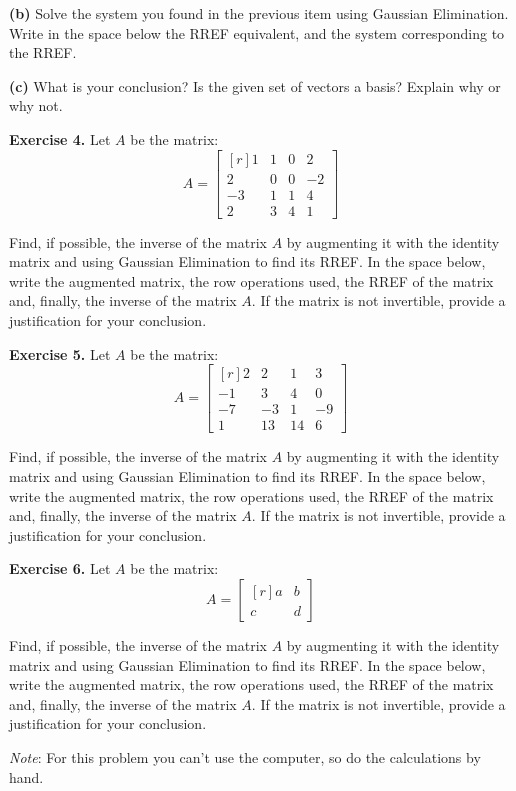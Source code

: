 \documentclass[12pt]{article}
\begin{document}
\vskip2in

\textbf{(b)} Solve the system you found in the previous item using Gaussian Elimination. Write in the space below the RREF equivalent, and the system corresponding to the RREF.

\vskip2.8in

\textbf{(c)} What is your conclusion? Is the given set of vectors a basis? Explain why or why not.

\clearpage

\textbf{Exercise 4.} Let $A$ be the matrix:
\[
A=\left[\begin{matrix*}[r]1 & 1 & 0 & 2\\2 & 0 & 0 & -2\\-3 & 1 & 1 & 4\\2 & 3 & 4 & 1\end{matrix*}\right]
\]

Find, if possible, the inverse of the matrix $A$ by augmenting it with the identity matrix and using Gaussian Elimination to find its RREF. In the space below, write the augmented matrix, the row operations used, the RREF of the matrix and, finally, the inverse of the matrix $A$. If the matrix is not invertible, provide a justification for your conclusion.

\clearpage

\textbf{Exercise 5.} Let $A$ be the matrix:
\[
A=\left[\begin{matrix*}[r]2 & 2 & 1 & 3\\-1 & 3 & 4 & 0\\-7 & -3 & 1 & -9\\1 & 13 & 14 & 6\end{matrix*}\right]
\]

Find, if possible, the inverse of the matrix $A$ by augmenting it with the identity matrix and using Gaussian Elimination to find its RREF. In the space below, write the augmented matrix, the row operations used, the RREF of the matrix and, finally, the inverse of the matrix $A$. If the matrix is not invertible, provide a justification for your conclusion.

\clearpage

\textbf{Exercise 6.} Let $A$ be the matrix:
\[
A=\left[\begin{matrix*}[r]a & b \\c & d\end{matrix*}\right]
\]

Find, if possible, the inverse of the matrix $A$ by augmenting it with the identity matrix and using Gaussian Elimination to find its RREF. In the space below, write the augmented matrix, the row operations used, the RREF of the matrix and, finally, the inverse of the matrix $A$. If the matrix is not invertible, provide a justification for your conclusion.

\emph{Note}: For this problem you can't use the computer, so do the calculations by hand.

\clearpage
\end{document}
